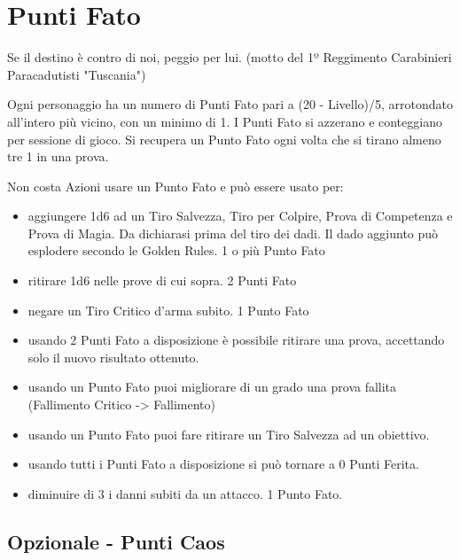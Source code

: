 \section{Punti Fato}\label{puntifato}

\begin{changemargin}{0.3cm}{0.3cm}\begin{enfasi}{Se il destino è contro di noi, peggio per lui. (motto del 1º Reggimento Carabinieri Paracadutisti "Tuscania")}\end{enfasi}\end{changemargin}

\medskip

Ogni personaggio ha un numero di Punti Fato pari a (20 - Livello)/5, arrotondato all'intero più vicino, con un minimo di 1. I Punti Fato si azzerano e conteggiano per sessione di gioco.
Si recupera un Punto Fato ogni volta che si tirano almeno tre 1 in una prova.

Non costa Azioni usare un Punto Fato e può essere usato per:

\noindent\begin{itemize}[leftmargin=*] \setlength{\itemsep}{0pt}
\item aggiungere 1d6 ad un Tiro Salvezza, Tiro per Colpire, Prova di Competenza e Prova di Magia. Da dichiarasi prima del tiro dei dadi. Il dado aggiunto può esplodere secondo le Golden Rules. 1 o più Punto Fato
\item ritirare 1d6 nelle prove di cui sopra. 2 Punti Fato
\item negare un Tiro Critico d'arma subito. 1 Punto Fato
\item usando 2 Punti Fato a disposizione è possibile ritirare una prova, accettando solo il nuovo risultato ottenuto.
\item usando un Punto Fato puoi migliorare di un grado una prova fallita (Fallimento Critico -> Fallimento)
\item usando un Punto Fato puoi fare ritirare un Tiro Salvezza ad un obiettivo.
\item usando tutti i Punti Fato a disposizione si può tornare a 0 Punti Ferita.
\item diminuire di 3 i danni subiti da un attacco. 1 Punto Fato.
\end{itemize}

\subsection*{Opzionale - Punti Caos}

